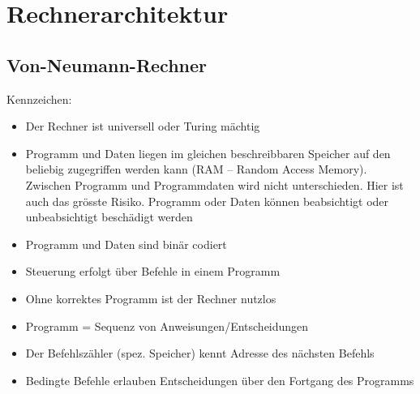 \section{Rechnerarchitektur}
\subsection{Von-Neumann-Rechner}
Kennzeichen:
\begin{itemize}\itemsep0em
	\item Der Rechner ist universell oder Turing mächtig	
	\item Programm und Daten liegen im gleichen beschreibbaren Speicher auf den beliebig zugegriffen werden kann (RAM -- Random Access Memory). Zwischen Programm und Programmdaten wird nicht unterschieden. Hier ist auch das grösste Risiko. Programm oder Daten können beabsichtigt oder unbeabsichtigt beschädigt werden
	\item Programm und Daten sind binär codiert
	\item Steuerung erfolgt über Befehle in einem Programm
	\item Ohne korrektes Programm ist der Rechner nutzlos
	\item Programm = Sequenz von Anweisungen/Entscheidungen
	\item Der Befehlszähler (spez. Speicher) kennt Adresse des nächsten Befehls
	\item Bedingte Befehle erlauben Entscheidungen über den Fortgang des Programms
\end{itemize}

